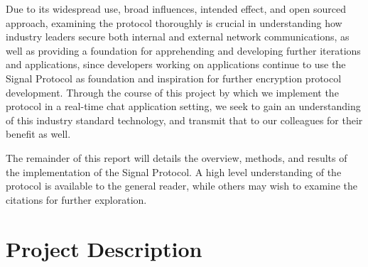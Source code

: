 \documentclass[12pt]{article}
\begin{document}
\par %
Due to its widespread use, broad influences, intended effect, and open sourced approach, examining the protocol thoroughly is crucial in understanding how industry leaders secure both internal and external network communications, as well as providing a foundation for apprehending and developing further iterations and applications, since developers working on applications continue to use the Signal Protocol as foundation and inspiration for further encryption protocol development.\parencite{website:global-adoption}\parencite{website:viber}\parencite{website:forsta}\parencite{website:forsta-gh} Through the course of this project by which we implement the protocol in a real-time chat application setting, we seek to gain an understanding of this industry standard technology, and transmit that to our colleagues for their benefit as well. 

\par%
The remainder of this report will details the overview, methods, and results of the implementation of the Signal Protocol. A high level understanding of the protocol is available to the general reader, while others may wish to examine the citations for further exploration.


\newpage
\section{Project Description}
\end{document}
